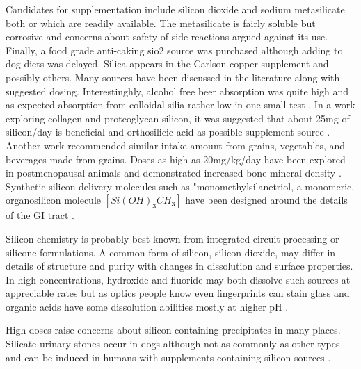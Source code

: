 Candidates for supplementation include silicon dioxide and sodium
metasilicate both or which are readily available. The metasilicate
is fairly soluble but corrosive and concerns about safety of side
reactions argued against its use. 
Finally, a food grade anti-caking  sio2 source was purchased 
\cite{DUM_Amazon_Silicon_Dioxide_} although
adding to dog diets was delayed.
Silica appears in the Carlson copper supplement and possibly others.
Many sources have been discussed in the literature along with
suggested dosing. 
Interestinghly, alcohol free beer absorption was quite high 
and as expected absorption from colloidal silia rather low
in one small test
\cite{Sripanyakorn_Jugdaohsingh_Dissayabutr_comparative_absorption_2009}.
In a work exploring collagen and proteoglycan silicon, it was suggested
that about 25mg of silicon/day is beneficial and orthosilicic acid
as possible supplement source 
\cite{doi:10.1177/1535370221997072}.
Another work recommended similar intake amount from grains, vegetables,
and beverages made from grains\cite{NIELSEN2014379}.
Doses as high as 20mg/kg/day have been explored in postmenopausal animals
and demonstrated increased bone mineral density
\cite{https://doi.org/10.1155/2013/316783}.
Synthetic silicon delivery molecules such as 
"monomethylsilanetriol, a monomeric, organosilicon molecule $[Si(OH)_3CH_3] $
have been designed around the details of the GI tract 
\cite{Scholey_Belton_Burton_Bioavailability_novel_2018}.

Silicon chemistry is probably best known from integrated circuit processing or silicone formulations.
A common form of silicon, silicon dioxide, may differ in details of
structure and purity with changes in dissolution and surface properties.
In high concentrations, hydroxide and fluoride may both dissolve such sources  at appreciable rates 
\cite{Bossert_Urban_Maceroni_hydrofluoric_acid_free_2019}
but as optics people know even fingerprints can stain glass
and organic acids have some dissolution abilities mostly at higher
pH \cite{BENNETT19881521}.

High doses raise concerns about silicon containing precipitates
in many places. 
Silicate urinary stones occur  in dogs
although not as commonly as other types 
\cite{Osborne_Jacob_Lulich_Canine_Silica_Urolithiasis_1999}
\cite{Urinary_calculi_small_Wenkel_Berg_1998}
 and can be induced in humans with
supplements containing silicon sources
\cite{FLYTHE2009127}.

